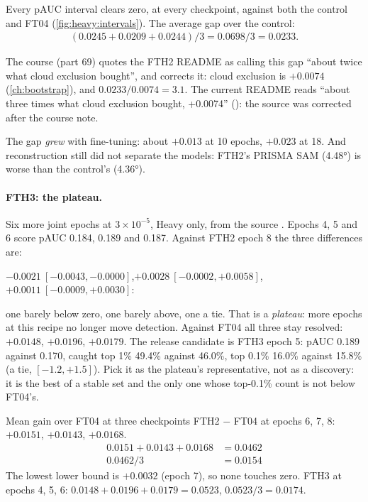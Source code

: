 Every pAUC interval clears zero, at every checkpoint, against both the control and FT04
(\cref{fig:heavy:intervals}). The average gap over the control:
\begin{align*}
(0.0245+0.0209+0.0244)/3 = 0.0698/3 = 0.0233 .
\end{align*}

\begin{sourcenote}
The course (part 69) quotes the FTH2 README as calling this gap ``about twice what cloud exclusion bought'', and
corrects it: cloud exclusion is $+0.0074$ (\cref{ch:bootstrap}), and $0.0233/0.0074=3.1$. The current README
reads ``about three times what cloud exclusion bought, +0.0074''
(): the source was corrected after the course note.
\end{sourcenote}

The gap \emph{grew} with fine-tuning: about $+0.013$ at 10 epochs, $+0.023$ at 18. And reconstruction still did not
separate the models: FTH2's PRISMA SAM (4.48°) is worse than the control's (4.36°).

\paragraph{FTH3: the plateau.} Six more joint epochs at $3\times10^{-5}$, Heavy only, from the source
. Epochs 4, 5 and 6 score pAUC 0.184, 0.189 and 0.187. Against FTH2 epoch 8
the three differences are:
\begin{center}
$-0.0021\ [-0.0043,-0.0000]$,\qquad $+0.0028\ [-0.0002,+0.0058]$,\qquad $+0.0011\ [-0.0009,+0.0030]$:
\end{center}
one barely below zero, one barely above, one a tie. That is a \emph{plateau}: more epochs at this recipe no longer move detection. Against
FT04 all three stay resolved: $+0.0148$, $+0.0196$, $+0.0179$. The release candidate is FTH3 epoch 5: pAUC 0.189
against 0.170, caught top 1\% 49.4\% against 46.0\%, top 0.1\% 16.0\% against 15.8\% (a tie, $[-1.2,+1.5]$). Pick it
as the plateau's representative, not as a discovery: it is the best of a stable set and the only one whose
top-0.1\% count is not below FT04's.

\begin{worked}[label={we:heavy:mean}]{Mean gain over FT04 at three checkpoints}
FTH2 $-$ FT04 at epochs 6, 7, 8: $+0.0151$, $+0.0143$, $+0.0168$.
\begin{align*}
0.0151+0.0143+0.0168 &= 0.0462\\
0.0462/3 &= 0.0154
\end{align*}
The lowest lower bound is $+0.0032$ (epoch 7), so none touches zero. FTH3 at epochs 4, 5, 6:
$0.0148+0.0196+0.0179=0.0523$, $0.0523/3=0.0174$.
\end{worked}

